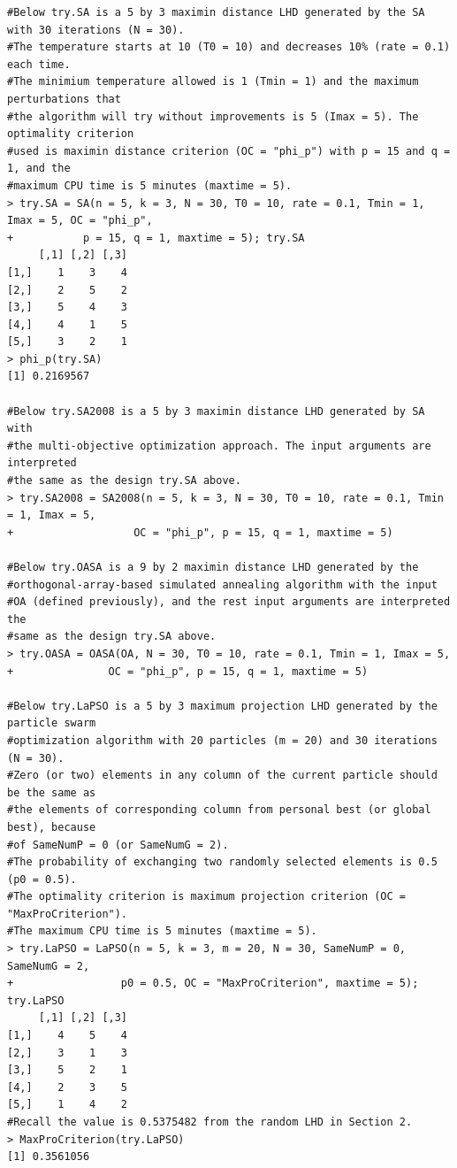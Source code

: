 {\small
	\begin{verbatim}
#Below try.SA is a 5 by 3 maximin distance LHD generated by the SA with 30 iterations (N = 30).
#The temperature starts at 10 (T0 = 10) and decreases 10% (rate = 0.1) each time.
#The minimium temperature allowed is 1 (Tmin = 1) and the maximum perturbations that
#the algorithm will try without improvements is 5 (Imax = 5). The optimality criterion
#used is maximin distance criterion (OC = "phi_p") with p = 15 and q = 1, and the
#maximum CPU time is 5 minutes (maxtime = 5).
> try.SA = SA(n = 5, k = 3, N = 30, T0 = 10, rate = 0.1, Tmin = 1, Imax = 5, OC = "phi_p",
+           p = 15, q = 1, maxtime = 5); try.SA
     [,1] [,2] [,3]
[1,]    1    3    4
[2,]    2    5    2
[3,]    5    4    3
[4,]    4    1    5
[5,]    3    2    1
> phi_p(try.SA)
[1] 0.2169567

#Below try.SA2008 is a 5 by 3 maximin distance LHD generated by SA with
#the multi-objective optimization approach. The input arguments are interpreted
#the same as the design try.SA above.
> try.SA2008 = SA2008(n = 5, k = 3, N = 30, T0 = 10, rate = 0.1, Tmin = 1, Imax = 5,
+                   OC = "phi_p", p = 15, q = 1, maxtime = 5)

#Below try.OASA is a 9 by 2 maximin distance LHD generated by the
#orthogonal-array-based simulated annealing algorithm with the input
#OA (defined previously), and the rest input arguments are interpreted the
#same as the design try.SA above.
> try.OASA = OASA(OA, N = 30, T0 = 10, rate = 0.1, Tmin = 1, Imax = 5,
+               OC = "phi_p", p = 15, q = 1, maxtime = 5)

#Below try.LaPSO is a 5 by 3 maximum projection LHD generated by the particle swarm
#optimization algorithm with 20 particles (m = 20) and 30 iterations (N = 30).
#Zero (or two) elements in any column of the current particle should be the same as
#the elements of corresponding column from personal best (or global best), because
#of SameNumP = 0 (or SameNumG = 2).
#The probability of exchanging two randomly selected elements is 0.5 (p0 = 0.5).
#The optimality criterion is maximum projection criterion (OC = "MaxProCriterion").
#The maximum CPU time is 5 minutes (maxtime = 5).
> try.LaPSO = LaPSO(n = 5, k = 3, m = 20, N = 30, SameNumP = 0, SameNumG = 2,
+                 p0 = 0.5, OC = "MaxProCriterion", maxtime = 5); try.LaPSO
     [,1] [,2] [,3]
[1,]    4    5    4
[2,]    3    1    3
[3,]    5    2    1
[4,]    2    3    5
[5,]    1    4    2
#Recall the value is 0.5375482 from the random LHD in Section 2.
> MaxProCriterion(try.LaPSO)
[1] 0.3561056


\end{verbatim}}
